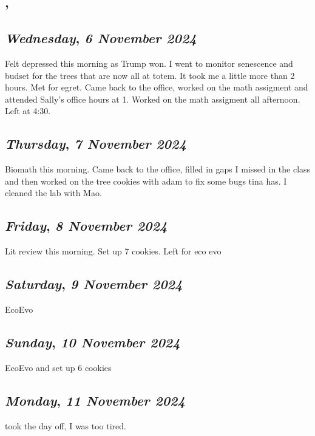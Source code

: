 \subsection*{\weekday, \day}

\def\day{\textit{6 November 2024}}
\def\weekday{\textit{Wednesday}}
\subsection*{\weekday, \day}
Felt depressed this morning as Trump won. I went to monitor senescence and budset for the trees that are now all at totem. It took me a little more than 2 hours. Met for egret. Came back to the office, worked on the math assigment and attended Sally's office hours at 1. Worked on the math assigment all afternoon. Left at 4:30.

\def\day{\textit{7 November 2024}}
\def\weekday{\textit{Thursday}}
\subsection*{\weekday, \day}
Biomath this morning. Came back to the office, filled in gaps I missed in the class and then worked on the tree cookies with adam to fix some bugs tina has. I cleaned the lab with Mao.

\def\day{\textit{8 November 2024}}
\def\weekday{\textit{Friday}}
\subsection*{\weekday, \day}
Lit review this morning. Set up 7 cookies. Left for eco evo

\def\day{\textit{9 November 2024}}
\def\weekday{\textit{Saturday}}
\subsection*{\weekday, \day}
EcoEvo
\def\day{\textit{10 November 2024}}
\def\weekday{\textit{Sunday}}
\subsection*{\weekday, \day}
EcoEvo and set up 6 cookies

\def\day{\textit{11 November 2024}}
\def\weekday{\textit{Monday}}
\subsection*{\weekday, \day}
took the day off, I was too tired.

